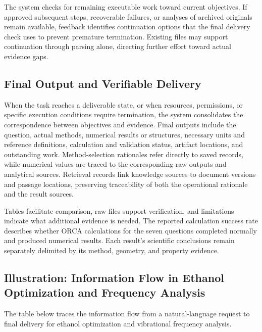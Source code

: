 The system checks for remaining executable work toward current objectives.
If approved subsequent steps, recoverable failures, or analyses of archived originals remain available, feedback identifies continuation options that the final delivery check uses to prevent premature termination.
Existing files may support continuation through parsing alone, directing further effort toward actual evidence gaps.

\subsection{Final Output and Verifiable Delivery}
When the task reaches a deliverable state, or when resources, permissions, or specific execution conditions require termination, the system consolidates the correspondence between objectives and evidence.
Final outputs include the question, actual methods, numerical results or structures, necessary units and reference definitions, calculation and validation status, artifact locations, and outstanding work.
Method-selection rationales refer directly to saved records, while numerical values are traced to the corresponding raw outputs and analytical sources.
Retrieval records link knowledge sources to document versions and passage locations, preserving traceability of both the operational rationale and the result sources.

Tables facilitate comparison, raw files support verification, and limitations indicate what additional evidence is needed.
The reported calculation success rate describes whether ORCA calculations for the seven questions completed normally and produced numerical results.
Each result's scientific conclusions remain separately delimited by its method, geometry, and property evidence.

\subsection{Illustration: Information Flow in Ethanol Optimization and Frequency Analysis}
The table below traces the information flow from a natural-language request to final delivery for ethanol optimization and vibrational frequency analysis.

